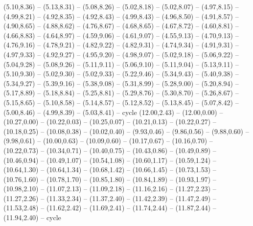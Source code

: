 {  (5.10,8.36) -- (5.13,8.31) -- (5.08,8.26) -- (5.02,8.18) -- (5.02,8.07) -- (4.97,8.15) -- (4.99,8.21) -- (4.92,8.35) -- (4.92,8.43) -- (4.99,8.43) -- (4.96,8.50) -- (4.91,8.57) -- (4.90,8.65) -- (4.88,8.62) -- (4.76,8.67) -- (4.68,8.65) -- (4.67,8.72) -- (4.60,8.81) -- (4.66,8.83) -- (4.64,8.97) -- (4.59,9.06) -- (4.61,9.07) -- (4.55,9.13) -- (4.70,9.13) -- (4.76,9.16) -- (4.78,9.21) -- (4.82,9.22) -- (4.82,9.31) -- (4.74,9.34) -- (4.91,9.31) -- (4.97,9.33) -- (4.92,9.27) -- (4.95,9.20) -- (4.98,9.07) -- (5.02,9.18) -- (5.06,9.22) -- (5.04,9.28) -- (5.08,9.26) -- (5.11,9.11) -- (5.06,9.10) -- (5.11,9.04) -- (5.13,9.11) -- (5.10,9.30) -- (5.02,9.30) -- (5.02,9.33) -- (5.22,9.46) -- (5.34,9.43) -- (5.40,9.38) -- (5.34,9.27) -- (5.39,9.16) -- (5.38,9.08) -- (5.31,8.99) -- (5.28,9.00) -- (5.20,8.94) -- (5.17,8.89) -- (5.18,8.84) -- (5.25,8.81) -- (5.29,8.76) -- (5.30,8.70) -- (5.26,8.67) -- (5.15,8.65) -- (5.10,8.58) -- (5.14,8.57) -- (5.12,8.52) -- (5.13,8.45) -- (5.07,8.42) -- (5.00,8.46) -- (4.99,8.39) -- (5.03,8.41) -- cycle}
\expandafter\def\csname geo:gebiet:heute-ROU\endcsname{
  (12.00,2.43) -- (12.00,0.00) -- (10.27,0.00) -- (10.22,0.03) -- (10.25,0.07) -- (10.21,0.13) -- (10.22,0.27) -- (10.18,0.25) -- (10.08,0.38) -- (10.02,0.40) -- (9.93,0.46) -- (9.86,0.56) -- (9.88,0.60) -- (9.98,0.61) -- (10.00,0.63) -- (10.09,0.60) -- (10.17,0.67) -- (10.16,0.70) -- (10.22,0.73) -- (10.34,0.71) -- (10.40,0.75) -- (10.43,0.86) -- (10.49,0.89) -- (10.46,0.94) -- (10.49,1.07) -- (10.54,1.08) -- (10.60,1.17) -- (10.59,1.24) -- (10.64,1.30) -- (10.64,1.34) -- (10.68,1.42) -- (10.66,1.45) -- (10.73,1.53) -- (10.76,1.60) -- (10.78,1.70) -- (10.85,1.80) -- (10.84,1.89) -- (10.93,1.97) -- (10.98,2.10) -- (11.07,2.13) -- (11.09,2.18) -- (11.16,2.16) -- (11.27,2.23) -- (11.27,2.26) -- (11.33,2.34) -- (11.37,2.40) -- (11.42,2.39) -- (11.47,2.49) -- (11.53,2.48) -- (11.62,2.42) -- (11.69,2.41) -- (11.74,2.44) -- (11.87,2.44) -- (11.94,2.40) -- cycle}
